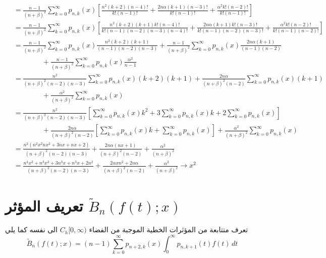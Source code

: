 \begin{align*}
	&= \frac{n-1}{(n+\beta)^2} \sum_{k=0}^{\infty}p_{n, k}(x) \left[\textstyle
	\frac{n^2(k+2)(n-4)!}{k!(n-1)!} + \frac{2n\alpha(k+1)(n-3)!}{k!(n-1)!} + \frac{\alpha^2 k!(n-2)!}{k!(n-1)!}
	\right]\\
	&= \frac{n-1}{(n+\beta)^2} \sum_{k=0}^{\infty}p_{n, k}(x) \left[\textstyle
	\frac{n^2(k+2)(k+1)k!(n-4)!}{k!(n-1)(n-2)(n-3)(n-4)!} + \frac{2n\alpha (k+1)k!(n-3)!}{k!(n-1)(n-2)(n-3)!}+
	\frac{\alpha^2 k!(n-2)!}{k!(n-1)(n-2)!}
	\right]\\
	&= \frac{n-1}{(n+\beta)^2} \sum_{k=0}^{\infty}p_{n, k}(x)  {\textstyle\frac{n^2(k+2)(k+1)}{(n-1)(n-2)(n-3)}} +  \frac{n-1}{(n+\beta)^2} \sum_{k=0}^{\infty}p_{n, k}(x) {\textstyle\frac{2n\alpha (k+1)}{(n-1)(n-2)}}\\
	&\qquad\qquad + \frac{n-1}{(n+\beta)^2} \sum_{k=0}^{\infty}p_{n, k}(x) {\textstyle\frac{\alpha^2}{n-1}}\\
	&= {\textstyle \frac{n^2}{(n+\beta)^2(n-2)(n-3)}}\sum_{k=0}^{\infty} p_{n,k}(x)(k+2)(k+1) + {\textstyle \frac{2n\alpha}{(n+\beta)^2(n-2)}} \sum_{k=0}^{\infty} p_{n,k}(x) (k+1)\\
	&\qquad\qquad + {\textstyle\frac{\alpha^2}{(n+\beta)^2}} \sum_{k=0}^{\infty} p_{n,k}(x)\\
	&= {\textstyle \frac{n^2}{(n+\beta)^2(n-2)(n-3)}} \left[
	\sum_{k=0}^{\infty}p_{n,k}(x) k^2 + 3 \sum_{k=0}^{\infty}p_{n,k}(x) k + 2 \sum_{k=0}^{\infty}p_{n,k}(x)
	\right]\\
	&\qquad\qquad + {\textstyle \frac{2n\alpha}{(n+\beta)^2(n-2)}} \left[
	\sum_{k=0}^{\infty}p_{n,k}(x)  k + \sum_{k=0}^{\infty}p_{n,k}(x) 
	\right]
	+  {\textstyle\frac{\alpha^2}{(n+\beta)^2}} \sum_{k=0}^{\infty} p_{n,k}(x)\\
	& = \frac{n^2(n^2x^2nx^2+3nx +nx+2)}{(n+\beta)^2(n-2)(n-3)} + \frac{2n\alpha(nx+1)}{(n+\beta)^2(n-2)} + \frac{\alpha^2}{(n+\beta)^2}\\
	& = \frac{n^4x^2+n^3x^2+3n^3x +n^3x+2n^2}{(n+\beta)^2(n-2)(n-3)} + \frac{2 \alpha x n^2+2n\alpha}{(n+\beta)^2(n-2)} + \frac{\alpha^2}{(n+\beta)^2} \to x^2 
\end{align*}

\newcommand{\tB}{\tilde{B}}
\section{تعريف المؤثر $\tB_n(f(t); x)$}

تعرف متتابعة من المؤثرات الخطية الموجبة من الفضاء $C_h[0, \infty)$ الى نفسه كما يلي
\[
\tB_n(f(t); x) = (n-1)\sum_{k=0}^{\infty} p_{n+2, k}(x) \int_{0}^{\infty} p_{n, k+1}(t) f(t) \, dt
\]

